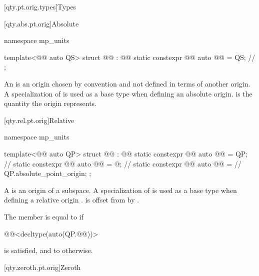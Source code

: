 [qty.pt.orig.types]{Types}

[qty.abs.pt.orig]{Absolute}

\begin{codeblock}
namespace mp_units {

template<@@ auto QS>
struct @@ : @@ {
  static constexpr @@ auto @@ = QS;  // \expos
};

}
\end{codeblock}

\pnum
An  is an origin
chosen by convention and not defined in terms of another origin.
A specialization of  is used as a base type when defining an absolute origin.
 is the quantity the origin represents.

[qty.rel.pt.orig]{Relative}

\begin{codeblock}
namespace mp_units {

template<@@ auto QP>
struct @@ : @@ {
  static constexpr @@ auto @@ = QP;       // \expos
  static constexpr @@ auto @@ = @\seebelownc@;  // \expos
  static constexpr @@ auto @@ =      // \expos
    QP.absolute_point_origin;
};

}
\end{codeblock}

\pnum
A  is an origin
of a subspace.
A specialization of  is used as a base type when defining a relative origin .
 is offset from  by .

\pnum
The member  is equal to
 if
\begin{codeblock}
@@<decltype(auto(QP.@@))>
\end{codeblock}
is satisfied, and
to  otherwise.

[qty.zeroth.pt.orig]{Zeroth}

